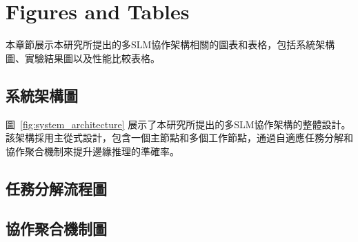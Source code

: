 \chapter{Figures and Tables}
\label{chapter:fig}

本章節展示本研究所提出的多SLM協作架構相關的圖表和表格，包括系統架構圖、實驗結果圖以及性能比較表格。

\section{系統架構圖}

圖~\ref{fig:system_architecture} 展示了本研究所提出的多SLM協作架構的整體設計。該架構採用主從式設計，包含一個主節點和多個工作節點，通過自適應任務分解和協作聚合機制來提升邊緣推理的準確率。


\section{任務分解流程圖}



\section{協作聚合機制圖}



